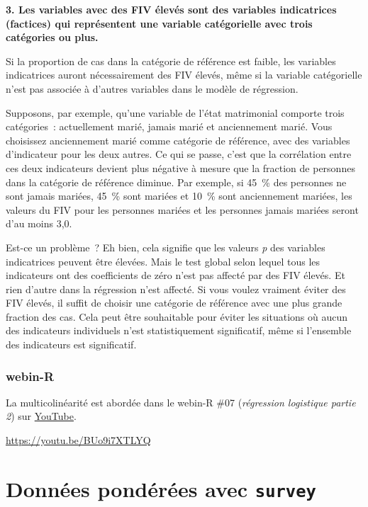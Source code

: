 \documentclass[
  letterpaper,
  DIV=11,
  numbers=noendperiod,
  oneside]{scrreprt}
\begin{document}
\textbf{3. Les variables avec des FIV élevés sont des variables
indicatrices (factices) qui représentent une variable catégorielle avec
trois catégories ou plus.}

Si la proportion de cas dans la catégorie de référence est faible, les
variables indicatrices auront nécessairement des FIV élevés, même si la
variable catégorielle n'est pas associée à d'autres variables dans le
modèle de régression.

Supposons, par exemple, qu'une variable de l'état matrimonial comporte
trois catégories~: actuellement marié, jamais marié et anciennement
marié. Vous choisissez anciennement marié comme catégorie de référence,
avec des variables d'indicateur pour les deux autres. Ce qui se passe,
c'est que la corrélation entre ces deux indicateurs devient plus
négative à mesure que la fraction de personnes dans la catégorie de
référence diminue. Par exemple, si 45~\% des personnes ne sont jamais
mariées, 45~\% sont mariées et 10~\% sont anciennement mariées, les
valeurs du FIV pour les personnes mariées et les personnes jamais
mariées seront d'au moins 3,0.

Est-ce un problème~? Eh bien, cela signifie que les valeurs \emph{p} des
variables indicatrices peuvent être élevées. Mais le test global selon
lequel tous les indicateurs ont des coefficients de zéro n'est pas
affecté par des FIV élevés. Et rien d'autre dans la régression n'est
affecté. Si vous voulez vraiment éviter des FIV élevés, il suffit de
choisir une catégorie de référence avec une plus grande fraction des
cas. Cela peut être souhaitable pour éviter les situations où aucun des
indicateurs individuels n'est statistiquement significatif, même si
l'ensemble des indicateurs est significatif.

\hypertarget{webin-r-9}{%
\section{webin-R}\label{webin-r-9}}

La multicolinéarité est abordée dans le webin-R \#07 (\emph{régression
logistique partie 2}) sur
\href{https://youtu.be/BUo9i7XTLYQ?t=4455}{YouTube}.

\url{https://youtu.be/BUo9i7XTLYQ}

\part{\textbf{Données pondérées avec \texttt{survey}}}
\end{document}
